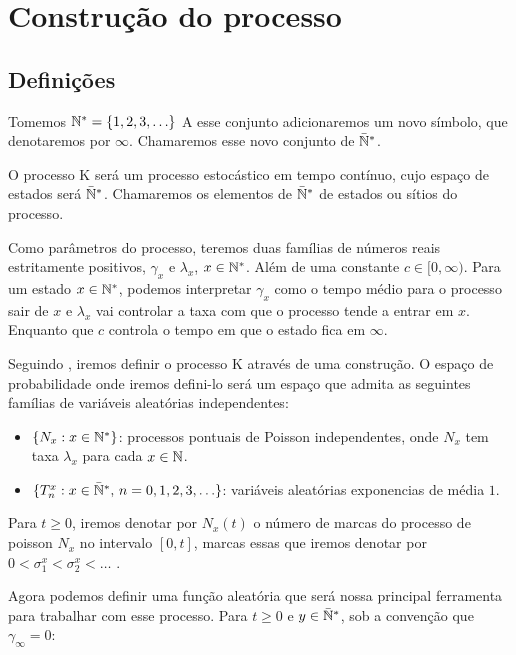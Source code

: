 \chapter{Construção do processo}
\label{cap:construcao}

\section{Definições}
\label{sec:definicoes}

Tomemos ${\mathbb{N^*}} = \{ 1, 2, 3, \ldots\}$ A esse conjunto adicionaremos um
novo símbolo, que denotaremos por $\infty$. Chamaremos esse novo
conjunto de ${\mathbb{\bar{N}^*}}$.

O processo K será um processo estocástico em tempo contínuo, cujo
espaço de estados será ${\mathbb{\bar{N}^*}}$. Chamaremos os elementos de ${\mathbb{\bar{N}^*}}$ de
estados ou sítios do processo.

Como parâmetros do processo, teremos duas famílias de números reais
estritamente positivos, $\gamma_x$ e $\lambda_x$, $x \in {\mathbb{N^*}}$. Além de
uma constante $c \in [0, \infty)$.  Para um estado $x \in {\mathbb{N^*}}$,
podemos interpretar $\gamma_x$ como o tempo médio para o processo sair
de $x$ e $\lambda_x$ vai controlar a taxa com que o processo tende a
entrar em $x$. Enquanto que $c$ controla o tempo em que o estado fica
em $\infty$.

Seguindo \cite{fontes:08}, iremos definir o processo K através de uma
construção. O espaço de probabilidade onde iremos defini-lo
será um espaço que admita as seguintes famílias de variáveis
aleatórias independentes:

\begin{itemize}
\item $\{ N_x: x \in {\mathbb{N^*}} \}$: processos pontuais de Poisson
  independentes, onde $N_x$ tem taxa $\lambda_x$ para cada $x \in {\mathbb{N}}$.
\item $\{T_n^x: x \in {\mathbb{\bar{N}^*}} , \, n = 0, 1, 2, 3, \ldots \}$: variáveis
  aleatórias exponencias de média $1$.
\end{itemize}

Para $t \geq 0$, iremos denotar por $N_x(t)$ o número de marcas do
processo de poisson $N_x$ no intervalo $[0, t]$, marcas essas que
iremos denotar por $0 < \sigma_1^x < \sigma_2^x < \ldots$ .

Agora podemos definir uma função aleatória que será nossa principal
ferramenta para trabalhar com esse processo. Para $t \geq 0$ e $y \in
{\mathbb{\bar{N}^*}}$, sob a convenção que $\gamma_\infty = 0$:

